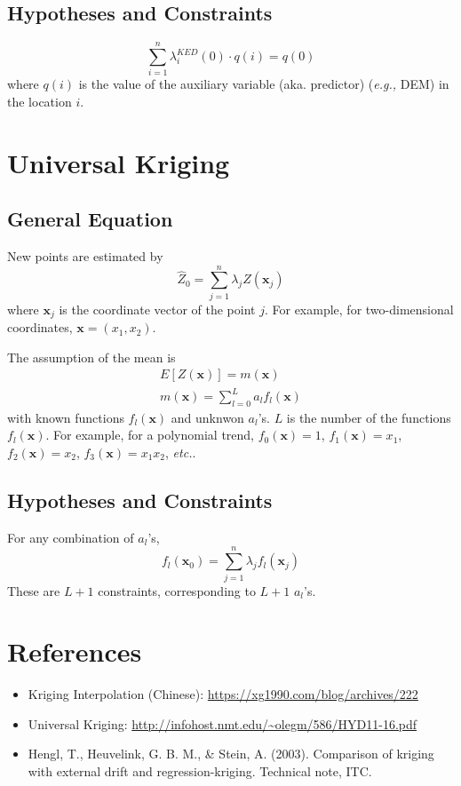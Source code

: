 \documentclass{article}
\begin{document}
\subsection{Hypotheses and Constraints}
\begin{equation}
    \sum_{i=1}^n\lambda_i^{KED}(0)\cdot q(i)=q(0)
\end{equation}
where $q(i)$ is the value of the auxiliary variable (aka. predictor) (\textit{e.g.,} DEM) in the location $i$.

\section{Universal Kriging}
\subsection{General Equation}
New points are estimated by 
\begin{equation}
    \hat{Z}_0=\sum_{j=1}^n\lambda_jZ(\mathbf{x}_j)
\end{equation}
where $\mathbf{x}_j$ is the coordinate vector of the point $j$. For example, for two-dimensional coordinates, $\mathbf{x}=(x_1, x_2)$.

The assumption of the mean is 
\begin{equation}
    \begin{split}
        E[Z(\mathbf{x})]=m(\mathbf{x}) \\
        m(\mathbf{x})=\sum_{l=0}^La_lf_l(\mathbf{x})
    \end{split}
\end{equation}
with known functions $f_l(\mathbf{x})$ and unknwon $a_l$'s. $L$ is the number of the functions $f_l(\mathbf{x})$. For example, for a polynomial trend, $f_0(\mathbf{x})=1$, $f_1(\mathbf{x})=x_1$, $f_2(\mathbf{x})=x_2$, $f_3(\mathbf{x})=x_1x_2$, \textit{etc.}. 

\subsection{Hypotheses and Constraints}
For any combination of $a_l$'s,
\begin{equation}
    f_l(\mathbf{x}_0)=\sum_{j=1}^n\lambda_jf_l(\mathbf{x}_j)
\end{equation}
These are $L+1$ constraints, corresponding to $L+1$ $a_l$'s. 

\section*{References}
\begin{itemize}
    \item Kriging Interpolation (Chinese): \url{https://xg1990.com/blog/archives/222}
    \item Universal Kriging: \url{http://infohost.nmt.edu/~olegm/586/HYD11-16.pdf}
    \item Hengl, T., Heuvelink, G. B. M., \& Stein, A. (2003). Comparison of kriging with external drift and regression-kriging. Technical note, ITC.
\end{itemize}
\end{document}
